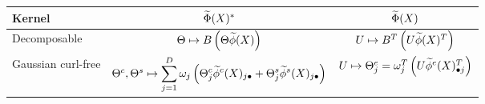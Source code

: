 {\begin{landscape}
\begin{table}[htb]{}
\begin{threeparttable}

\begin{tabularx}{\textheight}{Xcc}
\toprule
    Kernel & $\widetilde{\Phi}(X)^*$ & $\widetilde{\Phi}(X)$ \\
\midrule
    Decomposable\tnote{1} &$\Theta\mapsto B\left(\Theta \widetilde{\phi}(X)\right)$ & $U\mapsto B^T\left(U\widetilde{\phi}(X)^T\right)$ \\

    Gaussian curl-free\tnote{2} & $\Theta^c, \Theta^s\mapsto \displaystyle\sum_{j=1}^D\omega_j\left(\Theta_{j}^c\widetilde{\phi}^{c}(X)_{j\bullet} + \Theta_{j}^s\widetilde{\phi}^{s}(X)_{j\bullet} \right)$ & $U\mapsto \Theta_j^e=\omega_j^T \left(U\widetilde{\phi}^{e}(X)_{\bullet j}^T\right)$ \\


\end{tabularx}
\end{threeparttable}
\end{table}
\end{landscape}}
